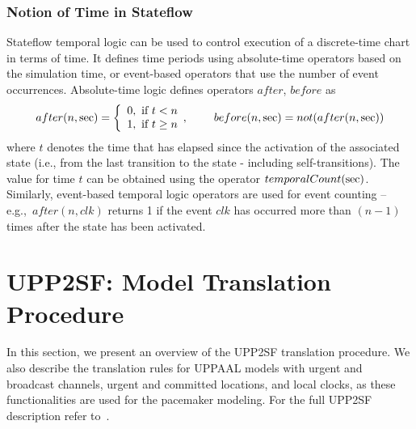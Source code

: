 \subsubsection{Notion of Time in Stateflow}
Stateflow temporal logic can be used to control execution of a discrete-time chart in terms of time. It defines time periods using absolute-time operators based on the simulation time, or event-based operators that use the number of event occurrences. Absolute-time logic defines operators $after$, $before$ as
\begin{equation}
\label{eqn:temp_logic}
after(n, \hbox{sec}) = \left\{
\begin{array}{lr} 0,\hbox{ if } t< n\\
1,\hbox{ if } t\geq n\end{array},
\right.
~~~~~~
before(n, \hbox{sec}) = not(after(n, \hbox{sec}))
\end{equation}
where $t$ denotes the time that has elapsed since the activation of the associated state (i.e., from the last transition to the state - including self-transitions). The value for time $t$ can be obtained using the operator $temporalCount(\hbox{sec})$. Similarly, event-based temporal logic operators are used for event counting -- e.g.,~$after(n,clk)$ returns 1 if the event $clk$ has occurred more than $(n-1)$ times after the state has been activated.
\section{UPP2SF: Model Translation Procedure}
\label{sec:upp2sf}

In this section, we present an overview of the UPP2SF translation procedure. We also describe the translation rules for UPPAAL models with urgent and broadcast channels, urgent and committed locations, and local clocks, as these functionalities are used for the pacemaker modeling. For the full UPP2SF description refer to~\cite{upp2sf_rep}. 


